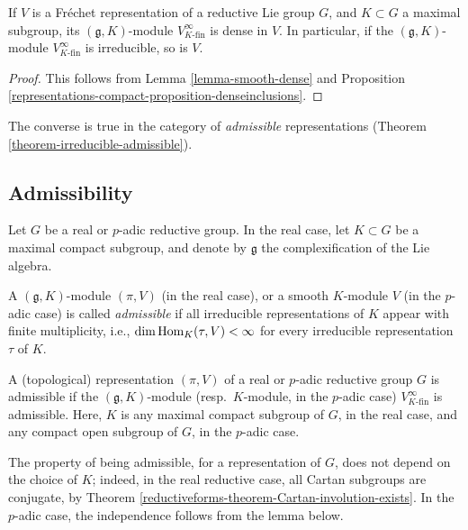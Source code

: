\begin{lemma}
 \label{lemma-gK-dense}
If $V$ is a Fr\'echet representation of a reductive Lie group $G$, and $K\subset G$ a maximal subgroup, its $(\mathfrak g,K)$-module $V^\infty_{K\text{-fin}}$ is dense in $V$. In particular, if the $(\mathfrak g, K)$-module $V^\infty_{K\text{-fin}}$ is irreducible, so is $V$. 
\end{lemma}

\begin{proof}
 This follows from Lemma \ref{lemma-smooth-dense} and Proposition \ref{representations-compact-proposition-denseinclusions}. 
\end{proof}

The converse is true in the category of \emph{admissible} representations (Theorem \ref{theorem-irreducible-admissible}). 


\subsection{Admissibility}
\label{subsection-admissibility}

Let $G$ be a real or $p$-adic reductive group. In the real case, let $K\subset G$ be a maximal compact subgroup, and denote by $\mathfrak g$ the complexification of the Lie algebra.

\begin{definition}
 \label{definition-admissible}
A $(\mathfrak g, K)$-module $(\pi, V)$ (in the real case), or a smooth $K$-module $V$ (in the $p$-adic case) is called {\it admissible} if  all irreducible representations of $K$ appear with finite multiplicity, i.e., $\dim\mathop{\rm Hom}\nolimits_K(\tau, V)<\infty$ for every irreducible representation $\tau$ of $K$. 

A (topological) representation $(\pi, V)$ of a real or $p$-adic reductive group $G$ is admissible if the $(\mathfrak g, K)$-module (resp.\ $K$-module, in the $p$-adic case) $V^\infty_{K\text{-fin}}$ is admissible. Here, $K$ is any maximal compact subgroup of $G$, in the real case, and any compact open subgroup of $G$, in the $p$-adic case.
\end{definition}


\begin{remark}
 \label{remark-admissible-indep-K}
The property of being admissible, for a representation of $G$, does not depend on the choice of $K$; indeed, in the real reductive case, all Cartan subgroups are conjugate, by Theorem \ref{reductiveforms-theorem-Cartan-involution-exists}. In the $p$-adic case, the independence follows from the lemma below.
\end{remark}

